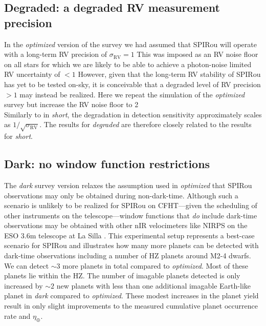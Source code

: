 \subsection{Degraded: a degraded RV measurement precision}
In the \emph{optimized} version of the survey we had assumed that SPIRou will operate with a long-term RV precision
of $\sigma_{\text{RV}}=1$  This was imposed as an RV noise floor on all stars for which we are likely
to be able to achieve a photon-noise limited RV uncertainty of $<1$  However, given that the
long-term RV stability of SPIRou has yet to be tested on-sky, it is conceivable that a degraded level of RV precision
$>1$ \mps{} may instead be realized. Here we repeat the simulation of the \emph{optimized} survey but increase
the RV noise floor to 2  \\

Similarly to in \emph{short}, the degradation in detection sensitivity approximately scales as
$1/\sqrt{\sigma_{\text{RV}}}$. The results for \emph{degraded} are therefore closely related to the results for
\emph{short}.

\subsection{Dark: no window function restrictions}
The \emph{dark} survey version relaxes the assumption used in \emph{optimized} that SPIRou observations may
only be obtained during non-dark-time. Although such a scenario is unlikely to be realized for SPIRou on
CFHT---given the scheduling of other instruments on the telescope---window functions that \emph{do} include
dark-time observations may be obtained with other nIR velocimeters like
NIRPS on the ESO 3.6m telescope at La Silla \citep{bouchy17}. This experimental setup represents a best-case
scenario for SPIRou and illustrates how many more planets can be detected with dark-time observations
including a number of HZ planets around M2-4 dwarfs. \\

We can detect $\sim 3$ more planets in total compared to \emph{optimized}. Most of these planets lie within
the HZ. The number of imagable planets detected is only increased by $\sim 2$ new planets with less than one
additional imagable Earth-like planet in \emph{dark} compared to \emph{optimized}. These modest increases in
the planet yield result in only slight improvements to the measured cumulative planet occurrence rate and
$\eta_{\oplus}$.




